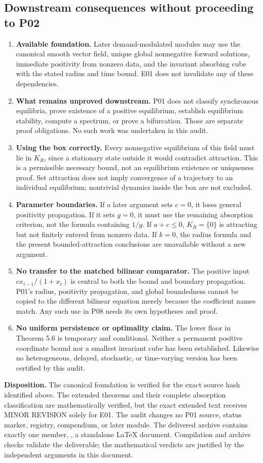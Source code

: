 \documentclass[11pt]{article}
\begin{document}
\subsection{Downstream consequences without proceeding to P02}
\begin{enumerate}
\item \textbf{Available foundation.} Later demand-modulated modules may
use the canonical smooth vector field, unique global nonnegative
forward solutions, immediate positivity from nonzero data, and the
invariant absorbing cube with the stated radius and time bound. E01
does not invalidate any of these dependencies.
\item \textbf{What remains unproved downstream.} P01 does not classify
synchronous equilibria, prove existence of a positive equilibrium,
establish equilibrium stability, compute a spectrum, or prove a
bifurcation. Those are separate proof obligations. No such work was
undertaken in this audit.
\item \textbf{Using the box correctly.} Every nonnegative equilibrium
of this field must lie in $K_R$, since a stationary state outside it
would contradict attraction. This is a permissible necessary bound,
not an equilibrium existence or uniqueness proof. Set attraction does
not imply convergence of a trajectory to an individual equilibrium;
nontrivial dynamics inside the box are not excluded.
\item \textbf{Parameter boundaries.} If a later argument sets $c=0$,
it loses general positivity propagation. If it sets $g=0$, it must
use the remaining absorption criterion, not the formula containing
$1/g$. If $a+c\leq0$, $K_R=\{0\}$ is attracting but not finitely
entered from nonzero data. If $k=0$, the radius formula and the present
bounded-attraction conclusions are unavailable without a new argument.
\item \textbf{No transfer to the matched bilinear comparator.} The
positive input $c x_{i-1}/(1+x_i)$ is central to both the bound and
boundary propagation. P01's radius, positivity propagation, and global
boundedness cannot be copied to the different bilinear equation merely
because the coefficient names match. Any such use in P08 needs its
own hypotheses and proof.
\item \textbf{No uniform persistence or optimality claim.} The lower
floor in Theorem 5.6 is temporary and conditional. Neither a permanent
positive coordinate bound nor a smallest invariant cube has been established.
Likewise no heterogeneous, delayed, stochastic, or time-varying version
has been certified by this audit.
\end{enumerate}

\textbf{Disposition.} The canonical foundation is verified for the exact
source hash identified above. The extended theorems and their complete
absorption classification are mathematically verified, but the exact
extended text receives MINOR REVISION solely for E01. The audit changes
no P01 source, status marker, registry, compendium, or later module.
The delivered archive contains exactly one member,
, a standalone
LaTeX document. Compilation and archive checks validate the deliverable;
the mathematical verdicts are justified by the independent arguments
in this document.
\end{document}
